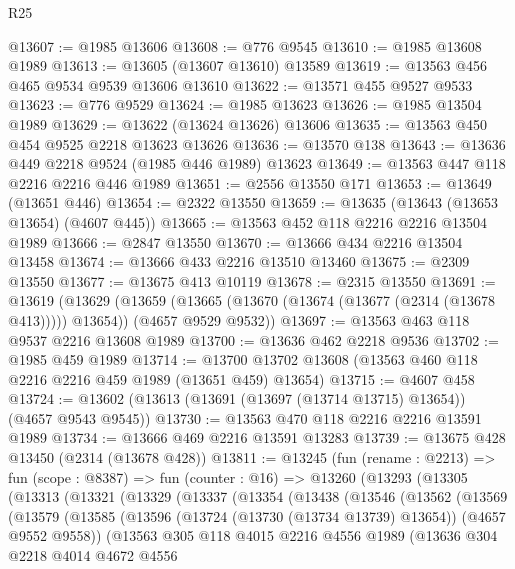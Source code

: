 \begin{lexlean}{R25}
\begin{coremodule}
@13607 := @1985 @13606
@13608 := @776 @9545
@13610 := @1985 @13608 @1989
@13613 := @13605 (@13607 @13610) @13589
@13619 := @13563 @456 @465 @9534 @9539 @13606 @13610
@13622 := @13571 @455 @9527 @9533
@13623 := @776 @9529
@13624 := @1985 @13623
@13626 := @1985 @13504 @1989
@13629 := @13622 (@13624 @13626) @13606
@13635 := @13563 @450 @454 @9525 @2218 @13623 @13626
@13636 := @13570 @138
@13643 := @13636 @449 @2218 @9524 (@1985 @446 @1989) @13623
@13649 := @13563 @447 @118 @2216 @2216 @446 @1989
@13651 := @2556 @13550 @171
@13653 := @13649 (@13651 @446)
@13654 := @2322 @13550
@13659 := @13635 (@13643 (@13653 @13654) (@4607 @445))
@13665 := @13563 @452 @118 @2216 @2216 @13504 @1989
@13666 := @2847 @13550
@13670 := @13666 @434 @2216 @13504 @13458
@13674 := @13666 @433 @2216 @13510 @13460
@13675 := @2309 @13550
@13677 := @13675 @413 @10119
@13678 := @2315 @13550
@13691 := @13619
    (@13629
      (@13659 (@13665 (@13670 (@13674 (@13677 (@2314 (@13678 @413))))) @13654))
      (@4657 @9529 @9532))
@13697 := @13563 @463 @118 @9537 @2216 @13608 @1989
@13700 := @13636 @462 @2218 @9536
@13702 := @1985 @459 @1989
@13714 := @13700 @13702 @13608 (@13563 @460 @118 @2216 @2216 @459 @1989 (@13651 @459) @13654)
@13715 := @4607 @458
@13724 := @13602 (@13613 (@13691 (@13697 (@13714 @13715) @13654)) (@4657 @9543 @9545))
@13730 := @13563 @470 @118 @2216 @2216 @13591 @1989
@13734 := @13666 @469 @2216 @13591 @13283
@13739 := @13675 @428 @13450 (@2314 (@13678 @428))
@13811 := @13245
    (fun (rename : @2213) =>
    fun (scope : @8387) =>
    fun (counter : @16) =>
    @13260
      (@13293
        (@13305
          (@13313
            (@13321
              (@13329
                (@13337
                  (@13354
                    (@13438
                      (@13546
                        (@13562
                          (@13569
                            (@13579
                              (@13585
                                (@13596
                                  (@13724 (@13730 (@13734 @13739) @13654))
                                  (@4657 @9552 @9558))
                                (@13563
                                  @305
                                  @118
                                  @4015
                                  @2216
                                  @4556
                                  @1989
                                  (@13636
                                    @304
                                    @2218
                                    @4014
                                    @4672
                                    @4556

\end{coremodule}
\end{lexlean}
